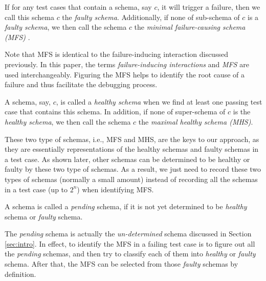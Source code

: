 \begin{definition} \label{de:faulty:minimal}
If for any test cases that contain a schema, say $c$, it will trigger a failure, then we call this schema $c$ the \emph{faulty schema}. Additionally, if none of sub-schema of $c$ is a \emph{faulty schema}, we then call the schema $c$ the \emph{minimal failure-causing schema (MFS)} \cite{nie2011minimal}.

\end{definition}

Note that MFS is identical to the failure-inducing interaction discussed previously. In this paper, the terms \emph{failure-inducing interactions} and \emph{MFS} are used interchangeably. Figuring the MFS helps to identify the root cause of a failure and thus facilitate the debugging process.


\begin{definition}\label{de:healthy:maximal}
A schema, say, $c$, is called a \emph{healthy schema} when we find at least one passing test case that contains this schema. In addition, if none of super-schema of $c$ is the \emph{healthy schema}, we then call the schema $c$ the \emph{maximal healthy schema (MHS)}.
\end{definition}

These two type of schemas, i.e., MFS and MHS, are the keys to our approach, as they are essentially representations of the healthy schemas and faulty schemas in a test case. As shown later, other schemas can be determined to be healthy or faulty by these two type of schemas. As a result, we just need to record these two types of schemas (normally a small amount) instead of recording all the schemas in a test case (up to $2^{n}$) when identifying MFS.


\begin{definition}\label{de:pending}
A schema is called a \emph{pending} schema, if it is not yet determined to be \emph{healthy} schema or \emph{faulty} schema.
\end{definition}

The \emph{pending} schema is actually the \emph{un-determined} schema discussed in Section \ref{sec:intro}. In effect, to identify the MFS in a failing test case is to figure out all the \emph{pending} schemas, and then try to classify each of them into \emph{healthy} or \emph{faulty} schema. After that, the MFS can be selected from those \emph{faulty} schemas by definition.

